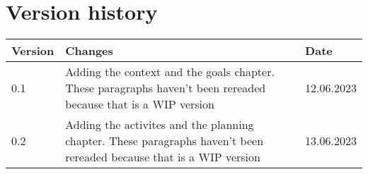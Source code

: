 \chapter{Version history}
\label{chap:spec-versions}

\begin{tabular}{|m{}|m{}|m{}|}
 \hline
 \textbf{Version} & \textbf{Changes} & \textbf{Date} \\ [0.5ex]
 \hline
 0.1 & Adding the context and the goals chapter. These paragraphs haven't been rereaded because that is a WIP version & 12.06.2023  \\
 0.2 & Adding the activites and the planning chapter. These paragraphs haven't been rereaded because that is a WIP version & 13.06.2023  \\
 \hline
\end{tabular}